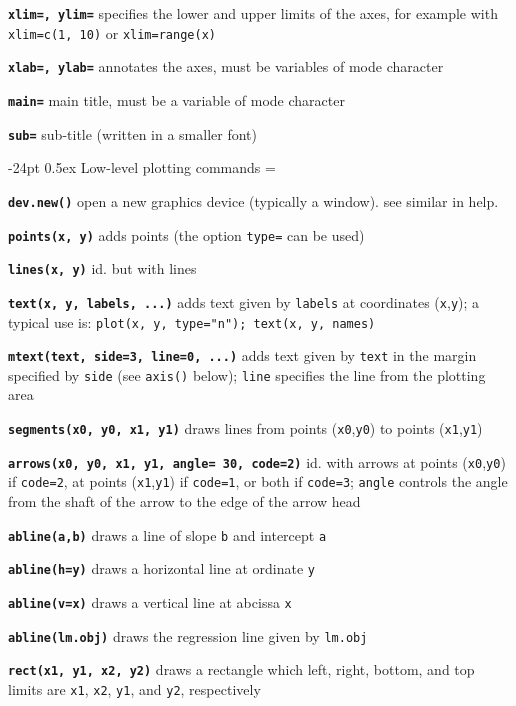 \documentclass[10pt,landscape]{article}
\makeatletter
\renewcommand\section{\@startsection{section}{1}{0mm}%
                                     {-24pt}%
                                     {0.5ex}%
                                {\color{blue}\normalfont\large\bfseries}}
\newcommand{\code}{\texttt}
\newcommand{\bcode}[1]{\texttt{\textbf{#1}}}
\makeatother
\begin{document}
\begin{multicols*}{3}
\bcode{xlim=, ylim=}  specifies the lower and upper limits of the axes, for example with \code{xlim=c(1, 10)} or \code{xlim=range(x)}

\bcode{xlab=, ylab=}  annotates the axes, must be variables of mode character

\bcode{main=}  main title, must be a variable of mode character

\bcode{sub=}  sub-title (written in a smaller font)

\section{Low-level plotting commands}
\everypar={\hangindent=9mm}

\bcode{dev.new()} open a new graphics device (typically a window). see
similar in help.

\bcode{points(x, y)}  adds points (the option \code{type=} can be used)

\bcode{lines(x, y)}  id. but with lines

\bcode{text(x, y, \mbox{labels}, ...)}  adds text given by \code{labels} at coordinates (\code{x},\code{y}); a typical use is: \code{plot(x, y, type="n"); text(x, y, names)}

\bcode{mtext(text, side=3, line=0, ...)}  adds text given by \code{text} in the margin specified by \code{side} (see \code{axis()} below); \code{line} specifies the line from the plotting area

\bcode{segments(x0, y0, x1, y1)}  draws lines from points (\code{x0},\code{y0}) to points (\code{x1},\code{y1})

\bcode{arrows(x0, y0, x1, y1, angle= 30, code=2)}  id. with arrows at points (\code{x0},\code{y0}) if \code{code=2}, at points (\code{x1},\code{y1}) if \code{code=1}, or both if \code{code=3}; \code{angle} controls the angle from the shaft of the arrow to the edge of the arrow head

\bcode{abline(a,b)}  draws a line of slope \code{b} and intercept \code{a}

\bcode{abline(h=y)}  draws a horizontal line at ordinate \code{y}

\bcode{abline(v=x)}  draws a vertical line at abcissa \code{x}

\bcode{abline(lm.obj)}  draws the regression line given by \code{lm.obj}

\bcode{rect(x1, y1, x2, y2)}  draws a rectangle which left, right, bottom, and top limits are \code{x1}, \code{x2}, \code{y1}, and \code{y2}, respectively


\end{multicols*}
\end{document}
